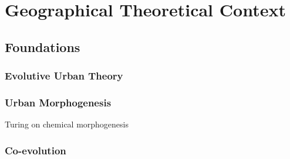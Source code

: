 \newpage



\section{Geographical Theoretical Context}



\subsection{Foundations}



\subsubsection{Evolutive Urban Theory}







\subsubsection{Urban Morphogenesis}


Turing on chemical morphogenesis~\cite{turing1952chemical}








\subsubsection{Co-evolution}




